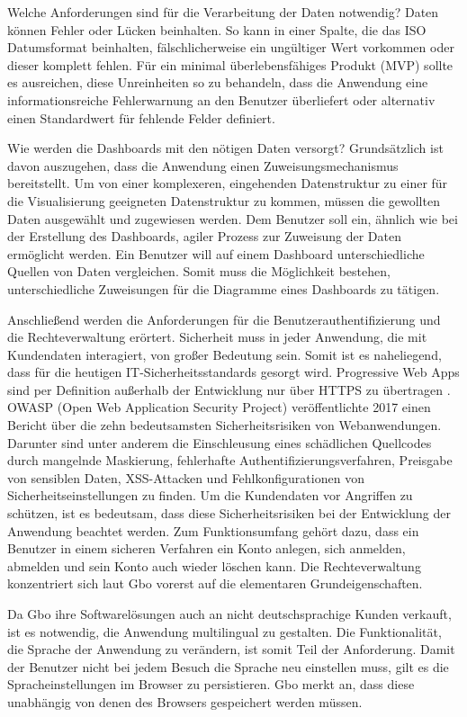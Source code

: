 Welche Anforderungen sind für die Verarbeitung der Daten notwendig? Daten können Fehler oder Lücken
beinhalten. So kann in einer Spalte, die das ISO Datumsformat beinhalten, fälschlicherweise ein
ungültiger Wert vorkommen oder dieser komplett fehlen. Für ein minimal überlebensfähiges
Produkt (MVP) sollte es ausreichen, diese Unreinheiten so zu behandeln, dass die Anwendung
eine informationsreiche Fehlerwarnung an den Benutzer überliefert oder alternativ einen Standardwert
für fehlende Felder definiert.

Wie werden die Dashboards mit den nötigen Daten versorgt? Grundsätzlich ist davon auszugehen,
dass die Anwendung einen Zuweisungsmechanismus bereitstellt. Um von einer komplexeren, eingehenden
Datenstruktur zu einer für die Visualisierung geeigneten Datenstruktur zu kommen, müssen die gewollten
Daten ausgewählt und zugewiesen werden. Dem Benutzer soll ein, ähnlich wie bei der Erstellung
des Dashboards, agiler Prozess zur Zuweisung der Daten ermöglicht werden. Ein Benutzer will auf einem
Dashboard unterschiedliche Quellen von Daten vergleichen. Somit muss die Möglichkeit bestehen,
unterschiedliche Zuweisungen für die Diagramme eines Dashboards zu tätigen.

Anschließend werden die Anforderungen für die Benutzerauthentifizierung und die Rechteverwaltung erörtert.
Sicherheit muss in jeder Anwendung, die mit Kundendaten interagiert, von großer Bedeutung sein.
Somit ist es naheliegend, dass für die heutigen IT-Sicherheitsstandards gesorgt wird. Progressive
Web Apps sind per Definition außerhalb der Entwicklung nur über HTTPS zu übertragen \cite[S. 16]{KevinFrankPWAMasterarbeit}.
OWASP (Open Web Application Security Project) veröffentlichte 2017 einen Bericht über die zehn
bedeutsamsten Sicherheitsrisiken von Webanwendungen. Darunter sind unter anderem die Einschleusung
eines schädlichen Quellcodes durch mangelnde Maskierung, fehlerhafte Authentifizierungsverfahren, Preisgabe von sensiblen Daten,
XSS-Attacken und Fehlkonfigurationen von Sicherheitseinstellungen zu finden.\cite[S. 4]{OWASPTopTen}
Um die Kundendaten vor Angriffen zu schützen, ist es bedeutsam, dass diese Sicherheitsrisiken bei der
Entwicklung der Anwendung beachtet werden. Zum Funktionsumfang gehört dazu,
dass ein Benutzer in einem sicheren Verfahren ein Konto anlegen,
sich anmelden, abmelden und sein Konto auch wieder
löschen kann. Die Rechteverwaltung konzentriert sich laut Gbo vorerst auf die elementaren
Grundeigenschaften.

Da Gbo ihre Softwarelösungen auch an nicht deutschsprachige Kunden verkauft, ist es notwendig,
die Anwendung multilingual zu gestalten. Die Funktionalität, die Sprache der Anwendung zu verändern,
ist somit Teil der Anforderung. Damit der Benutzer nicht bei jedem Besuch die Sprache neu einstellen
muss, gilt es die Spracheinstellungen im Browser zu persistieren. Gbo merkt an, dass diese
unabhängig von denen des Browsers gespeichert werden müssen.

